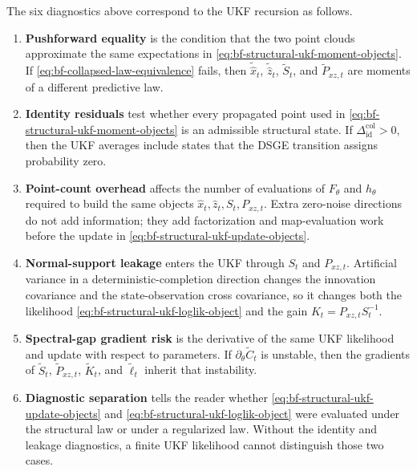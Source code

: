 The six diagnostics above correspond to the UKF recursion as follows.
\begin{enumerate}[label=(\roman*)]
  \item \textbf{Pushforward equality} is the condition that the two point clouds
    approximate the same expectations in
    \eqref{eq:bf-structural-ukf-moment-objects}.  If
    \eqref{eq:bf-collapsed-law-equivalence} fails, then
    $\widetilde{\hat x}_t$, $\widetilde{\hat z}_t$,
    $\widetilde S_t$, and $\widetilde P_{xz,t}$ are moments of a different
    predictive law.
  \item \textbf{Identity residuals} test whether every propagated point used in
    \eqref{eq:bf-structural-ukf-moment-objects} is an admissible structural
    state.  If
    $\Delta_{\mathrm{id}}^{\mathrm{col}}>0$, then the UKF averages include
    states that the DSGE transition assigns probability zero.
  \item \textbf{Point-count overhead} affects the number of evaluations of
    $F_\theta$ and $h_\theta$ required to build the same objects
    $\hat x_t,\hat z_t,S_t,P_{xz,t}$.  Extra zero-noise directions do not add
    information; they add factorization and map-evaluation work before the
    update in \eqref{eq:bf-structural-ukf-update-objects}.
  \item \textbf{Normal-support leakage} enters the UKF through $S_t$ and
    $P_{xz,t}$.  Artificial variance in a deterministic-completion direction
    changes the innovation covariance and the state-observation cross
    covariance, so it changes both the likelihood
    \eqref{eq:bf-structural-ukf-loglik-object} and the gain
    $K_t=P_{xz,t}S_t^{-1}$.
  \item \textbf{Spectral-gap gradient risk} is the derivative of the same UKF
    likelihood and update with respect to parameters.  If
    $\partial_\theta\widetilde C_t$ is unstable, then the gradients of
    $\widetilde S_t$, $\widetilde P_{xz,t}$, $\widetilde K_t$, and
    $\widetilde\ell_t$ inherit that instability.
  \item \textbf{Diagnostic separation} tells the reader whether
    \eqref{eq:bf-structural-ukf-update-objects} and
    \eqref{eq:bf-structural-ukf-loglik-object} were evaluated under the
    structural law or under a regularized law.  Without the identity and
    leakage diagnostics, a finite UKF likelihood cannot distinguish those two
    cases.
\end{enumerate}


